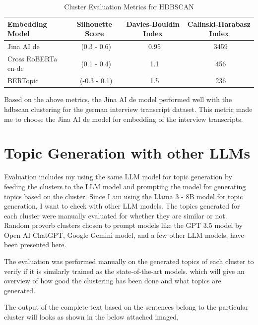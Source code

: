 \begin{table}[htbp]
    \centering

    \label{tab:cluster_metrics}
    \begin{tabular}{|l|c|c|c|}
    \hline
    \textbf{Embedding Model} & \textbf{Silhouette Score} & \textbf{Davies-Bouldin Index} & \textbf{Calinski-Harabasz Index} \\
    \hline
    Jina AI  de & ~(0.3 - 0.6) & ~0.95& ~3459 \\
    \hline
    Cross RoBERTa en-de & ~(0.1 - 0.4) & ~1.1 & ~456 \\
    \hline
    BERTopic & ~(-0.3 - 0.1) & ~1.5 & ~236 \\
    \hline

    \end{tabular}
    \caption{Cluster Evaluation Metrics for HDBSCAN}
\end{table}
\vspace{1cm}
Based on the above metrics, the Jina AI de model performed well with the hdbscan clustering for the german interview transcript dataset. 
This metric made me to choose the Jina AI de model for embedding of the interview transcripts.


\section{Topic Generation with other LLMs}

Evaluation includes my using the same LLM model for topic generation by feeding the clusters to the LLM model and prompting the model for
generating topics based on the cluster. Since I am using the Llama 3 - 8B model for topic generation, I want to check with other LLM models.
The topics generated for each cluster were manually evaluated for whether they are similar or not. Random proverb clusters chosen to prompt 
models like the GPT 3.5 model by Open AI ChatGPT, Google Gemini model, and a few other LLM models, have been presented here.

The evaluation was performed manually on the generated topics of each cluster to verify if it is similarly trained as the state-of-the-art models.
which will give an overview of how good the clustering has been done and what topics are generated.

The output of the complete text based on the sentences belong to the particular cluster will looks as shown in the below attached imaged,

